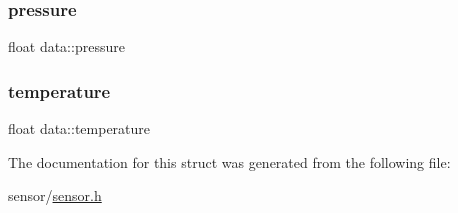 \subsubsection{\texorpdfstring{pressure}{pressure}}
{\footnotesize\ttfamily float data\+::pressure}

\mbox{\label{structdata_a92d573d048b933148a65e445b20df3b9}} 
\subsubsection{\texorpdfstring{temperature}{temperature}}
{\footnotesize\ttfamily float data\+::temperature}



The documentation for this struct was generated from the following file\+:\begin{DoxyCompactItemize}
\item 
sensor/\hyperlink{sensor_8h}{sensor.\+h}\end{DoxyCompactItemize}
